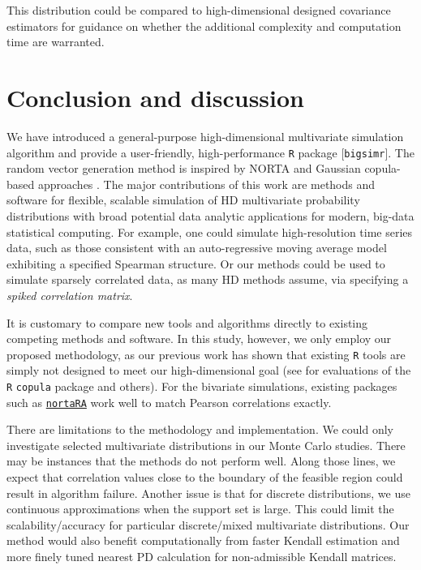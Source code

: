 \documentclass[
]{jss}
\begin{document}
This distribution could be compared to high-dimensional designed
covariance estimators for guidance on whether the additional complexity
and computation time are warranted.

\hypertarget{discussion}{%
\section{Conclusion and discussion}\label{discussion}}

We have introduced a general-purpose high-dimensional multivariate
simulation algorithm and provide a user-friendly, high-performance
\texttt{R} package {[}\texttt{bigsimr}{]}. The random vector generation
method is inspired by NORTA \citep{Cario1997} and Gaussian copula-based
approaches \citep[\citet{BF17}, \citet{Xia17}]{MB13}. The major
contributions of this work are methods and software for flexible,
scalable simulation of HD multivariate probability distributions with
broad potential data analytic applications for modern, big-data
statistical computing. For example, one could simulate high-resolution
time series data, such as those consistent with an auto-regressive
moving average model exhibiting a specified Spearman structure. Or our
methods could be used to simulate sparsely correlated data, as many HD
methods assume, via specifying a \emph{spiked correlation matrix}.

It is customary to compare new tools and algorithms directly to existing
competing methods and software. In this study, however, we only employ
our proposed methodology, as our previous work has shown that existing
\texttt{R} tools are simply not designed to meet our high-dimensional
goal (see \citet{Li2019gpu} for evaluations of the \texttt{R}
\texttt{copula} package and others). For the bivariate simulations,
existing packages such as
\href{https://github.com/superdesolator/NORTARA}{\texttt{nortaRA}} work
well to match Pearson correlations exactly.

There are limitations to the methodology and implementation. We could
only investigate selected multivariate distributions in our Monte Carlo
studies. There may be instances that the methods do not perform well.
Along those lines, we expect that correlation values close to the
boundary of the feasible region could result in algorithm failure.
Another issue is that for discrete distributions, we use continuous
approximations when the support set is large. This could limit the
scalability/accuracy for particular discrete/mixed multivariate
distributions. Our method would also benefit computationally from faster
Kendall estimation and more finely tuned nearest PD calculation for
non-admissible Kendall matrices.
\end{document}
